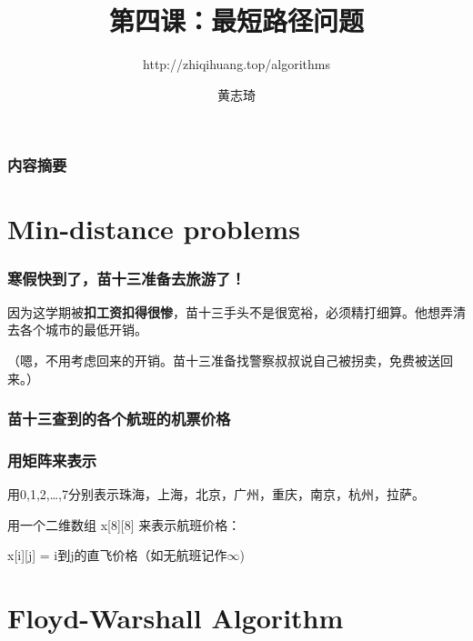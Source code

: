 \documentclass[CJK,14pt]{beamer}
\begin{document}
\bch

\title{第四课：最短路径问题}
\subtitle{http://zhiqihuang.top/algorithms}
  \author{黄志琦}
  \date{}

  \maketitle

  \begin{frame}
    \frametitle{内容摘要}
  \tableofcontents
  \end{frame}

  \section{Min-distance problems}

  \begin{frame}
    \frametitle{寒假快到了，苗十三准备去旅游了！}


    因为这学期被{\bf 扣工资扣得很惨}，苗十三手头不是很宽裕，必须精打细算。他想弄清去各个城市的最低开销。

    {\scriptsize（嗯，不用考虑回来的开销。苗十三准备找警察叔叔说自己被拐卖，免费被送回来。）}


  \end{frame}


  \begin{frame}
    \frametitle{苗十三查到的各个航班的机票价格}
  \end{frame}
  

  \begin{frame}
    \frametitle{用矩阵来表示}
    用0,1,2,\ldots,7分别表示珠海，上海，北京，广州，重庆，南京，杭州，拉萨。

    \skiplines
    
    用一个二维数组 x[8][8] 来表示航班价格：

    \skiplines
    
    x[i][j] = i到j的直飞价格（如无航班记作$\infty$)

  \end{frame}

  \section{Floyd-Warshall Algorithm}
\end{document}

